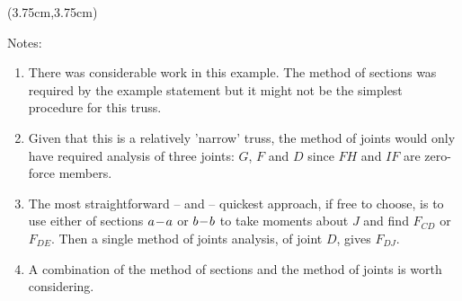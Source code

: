 \documentclass[8pt, xcolor={svgnames, x11names}]{beamer}
\begin{document}
\begin{frame}{}
{    \begin{textblock*}{8cm}(3.75cm,3.75cm)
      \begin{statsbox}[colback=NavajoWhite3!37]{Notes:}
        \small
        \begin{enumerate}
          \item There was considerable work in this example. The method of sections was required by the example statement but it might not be the simplest procedure for this truss.
          \item Given that this is a relatively 'narrow' truss, the method of joints would only have required analysis of three joints: $G$, $F$ and $D$ since $FH$ and $IF$ are zero-force members.
          \item The most straightforward -- and -- quickest approach, if free to choose, is to use either of sections $a\!-\! a$ or $b\!-\! b$ to take moments about $J$ and find $F_{CD}$ or $F_{DE}$. Then a single method of joints analysis, of joint $D$, gives $F_{DJ}$.
          \item A combination of the method of sections and the method of joints is worth considering.
         			
        \end{enumerate}
        \par
      \end{statsbox}
    \end{textblock*}
  }

  

  \end{frame}







\end{document}

